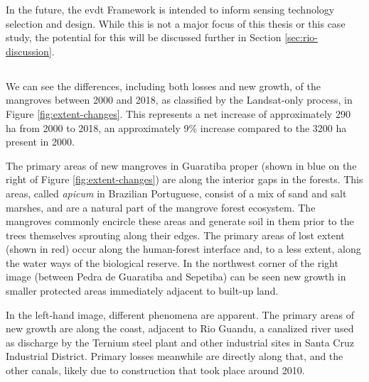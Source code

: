 In the future, the \ac{evdt} Framework is intended to inform sensing technology selection and design. While this is not a major focus of this thesis or this case study, the potential for this will be discussed further in Section \ref{sec:rio-discussion}.

\subsection{} \label{sec:rio-evdt-result}

\subsubsection{} \label{sec:rio-evdt-e-result}


\paragraph{} \leavevmode\newline

We can see the differences, including both losses and new growth, of the mangroves between 2000 and 2018, as classified by the Landsat-only process, in Figure \ref{fig:extent-changes}. This represents a net increase of approximately 290 ha from 2000 to 2018, an approximately 9\% increase compared to the 3200 ha present in 2000.

The primary areas of new mangroves in Guaratiba proper (shown in blue on the right of Figure \ref{fig:extent-changes}) are along the interior gaps in the forests. This areas, called \textit{apicum} in Brazilian Portuguese, consist of a mix of sand and salt marshes, and are a natural part of the mangrove forest ecosystem. The mangroves commonly encircle these areas and generate soil in them prior to the trees themselves sprouting along their edges. The primary areas of lost extent (shown in red) occur along the human-forest interface and, to a less extent, along the water ways of the biological reserve. In the northwest corner of the right image (between Pedra de Guaratiba and Sepetiba) can be seen new growth in smaller protected areas immediately adjacent to built-up land.

In the left-hand image, different phenomena are apparent. The primary areas of new growth are along the coast, adjacent to Rio Guandu, a canalized river used as discharge by the Ternium steel plant and other industrial sites in Santa Cruz Industrial District. Primary losses meanwhile are directly along that, and the other canals, likely due to construction that took place around 2010. 
	
